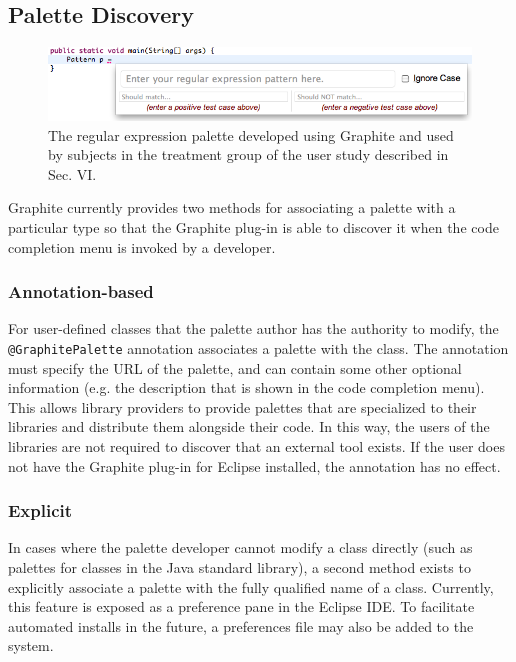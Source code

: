 \documentclass[10pt, conference, compsocconf]{IEEEtran}
\begin{document}
\subsection{Palette Discovery}
\begin{figure}\begin{center}
\includegraphics[scale=.6]{regex.png}\end{center}
\caption{The regular expression palette developed using Graphite and used by subjects in the treatment group of the user study described in Sec. VI.}
\end{figure}


Graphite currently provides two methods for associating a palette with a particular type so that the Graphite plug-in is able to discover it when the code completion menu is invoked by a developer.

\subsubsection{Annotation-based}
For user-defined classes that the palette author has the authority to modify, the \texttt{@GraphitePalette} annotation associates a palette with the class. The annotation must specify the URL of the palette, and can contain some other optional information (e.g. the description that is shown in the code completion menu). This  allows library providers to provide palettes that are specialized to their libraries and distribute them alongside their code. In this way, the users of the libraries are not required to discover that an external tool exists. If the user does not have the Graphite plug-in for Eclipse installed, the annotation has no effect.

\subsubsection{Explicit}
In cases where the palette developer cannot modify a class directly (such as palettes for classes in the Java standard library), a second method exists to explicitly associate a palette with the fully qualified name of a class. Currently, this feature is exposed as a preference pane in the Eclipse IDE. To facilitate automated installs in the future, a preferences file may also be added to the system. 
\end{document}
